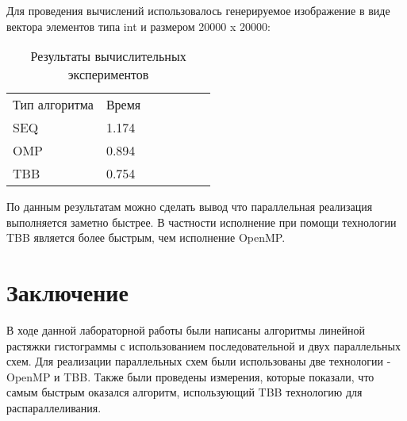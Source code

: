 \documentclass{report}
\begin{document}
\par Для проведения вычислений использовалось генерируемое изображение в виде вектора элементов типа int и размером 20000 x 20000:
\\

\begin{table}[!h]
\begin{center}
\begin{tabular}{lllllll}
Тип алгоритма & Время \\
SEQ        & 1.174 \\
OMP        & 0.894 \\
TBB        &  0.754 \\

\end{tabular}
\end{center}
\caption{Результаты вычислительных экспериментов}
\centering
\end{table}

\par По данным результатам можно сделать вывод что параллельная реализация выполняется заметно быстрее. В частности исполнение при помощи технологии TBB является более быстрым, чем исполнение OpenMP.
\newpage

\section*{Заключение}
В ходе данной лабораторной работы были написаны алгоритмы линейной растяжки гистограммы с использованием последовательной и двух параллельных схем. Для реализации параллельных схем были использованы две технологии - OpenMP и TBB. Также были проведены измерения, которые показали, что самым быстрым оказался алгоритм, использующий TBB технологию для распараллеливания.
\newpage
\end{document}
